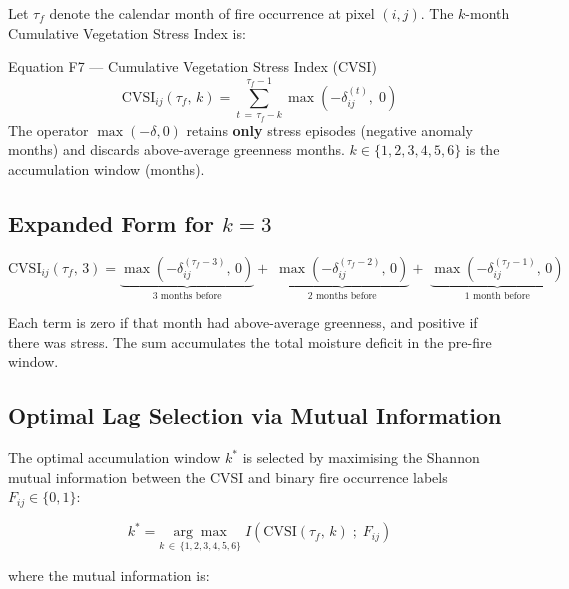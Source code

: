 \documentclass[12pt, a4paper]{article}
\begin{document}
Let $\tau_{f}$ denote the calendar month of fire occurrence at pixel
$(i,j)$.
The $k$-month Cumulative Vegetation Stress Index is:

\begin{mathbox}{Equation F7 — Cumulative Vegetation Stress Index (CVSI)}
\begin{equation}
  \boxed{
    \mathrm{CVSI}_{ij}\!\left(\tau_{f},\, k\right) =
    \sum_{t\,=\,\tau_{f} - k}^{\tau_{f} - 1}
    \max\!\left(-\delta_{ij}^{(t)},\; 0\right)
  }
  \label{eq:cvsi}
\end{equation}
The operator $\max(-\delta, 0)$ retains \textbf{only} stress episodes
(negative anomaly months) and discards above-average greenness months.
$k \in \{1, 2, 3, 4, 5, 6\}$ is the accumulation window (months).
\end{mathbox}

\subsection{Expanded Form for $k = 3$}

\begin{equation}
  \mathrm{CVSI}_{ij}(\tau_{f},\,3) =
  \underbrace{\max\!\left(-\delta_{ij}^{(\tau_{f}-3)},\,0\right)}_{\text{3 months before}}
  +\;
  \underbrace{\max\!\left(-\delta_{ij}^{(\tau_{f}-2)},\,0\right)}_{\text{2 months before}}
  +\;
  \underbrace{\max\!\left(-\delta_{ij}^{(\tau_{f}-1)},\,0\right)}_{\text{1 month before}}
  \label{eq:cvsi3}
\end{equation}

Each term is zero if that month had above-average greenness,
and positive if there was stress.
The sum accumulates the total moisture deficit in the pre-fire window.

\subsection{Optimal Lag Selection via Mutual Information}

The optimal accumulation window $k^{*}$ is selected by maximising the
Shannon mutual information between the CVSI and binary fire occurrence
labels $F_{ij} \in \{0, 1\}$:

\begin{equation}
  k^{*} =
  \underset{k\,\in\,\{1,2,3,4,5,6\}}{\arg\max}\;
  I\!\left(\mathrm{CVSI}(\tau_{f},\,k)\;;\;F_{ij}\right)
  \label{eq:mi_lag}
\end{equation}

where the mutual information is:
\end{document}
